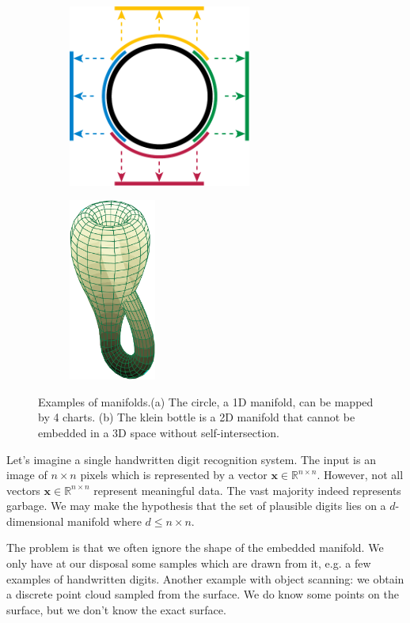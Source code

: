 \documentclass[a4paper,12pt,twoside]{report}
\newcommand{\R}{\mathbb{R}}
\newcommand{\x}{\mathbf{x}}
\begin{document}
\begin{figure}[ht]
	\centering
	\begin{subfigure}[b]{0.49\textwidth}
		\centering
		\includegraphics[height=6cm]{img/circle_manifold_charts}
		\caption{}
	\end{subfigure}
	\begin{subfigure}[b]{0.49\textwidth}
		\centering
		\includegraphics[height=6cm]{img/klein_bottle}
		\caption{}
	\end{subfigure}
	\caption[]{Examples of manifolds.\footnotemark (a) The circle, a 1D manifold, can be mapped by 4 charts. (b) The klein bottle is a 2D manifold that cannot be embedded in a 3D space without self-intersection.}
	\label{fig:manifolds}
\end{figure}

Let's imagine a single handwritten digit recognition system. The input is an image of $n \times n$ pixels which is represented by a vector $\x \in \R^{n \times n}$. However, not all vectors $\x \in \R^{n \times n}$ represent meaningful data. The vast majority indeed represents garbage. We may make the hypothesis that the set of plausible digits lies on a $d$-dimensional manifold where $d \leq n \times n$.

The problem is that we often ignore the shape of the embedded manifold. We only have at our disposal some samples which are drawn from it, e.g. a few examples of handwritten digits. Another example with object scanning: we obtain a discrete point cloud sampled from the surface. We do know some points on the surface, but we don't know the exact surface.
\end{document}
